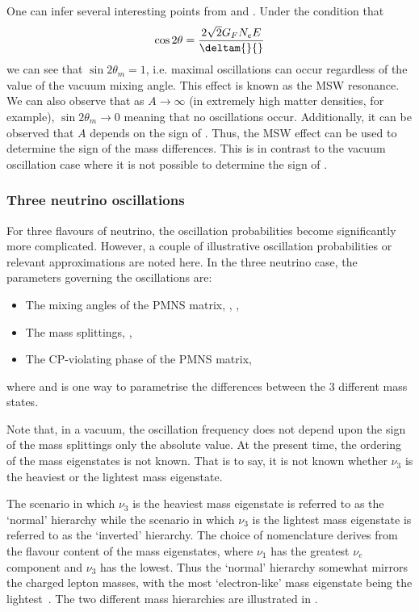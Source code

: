 One can infer several interesting points from  and .
Under the condition that
\begin{equation}
  \cos 2\theta = \frac{2 \sqrt{2} G_{F} N_{e} E}{\deltam{}{}}
\end{equation}
we can see that $\sin 2\theta_{m} = 1$, i.e. maximal oscillations can occur regardless of the value of the vacuum mixing angle.
This effect is known as the MSW resonance.
We can also observe that as $A \rightarrow \infty$ (in extremely high matter densities, for example), $\sin 2\theta_{m} \rightarrow 0$ meaning that no oscillations occur.
Additionally, it can be observed that $A$ depends on the sign of \deltam{}{}.
Thus, the MSW effect can be used to determine the sign of the mass differences.
This is in contrast to the vacuum oscillation case where it is not possible to determine the sign of \deltam{}{}.

\subsubsection{Three neutrino oscillations}
\label{sec:theory:theory:threeNeutrino}

For three flavours of neutrino, the oscillation probabilities become significantly more complicated.
However, a couple of illustrative oscillation probabilities or relevant approximations are noted here.
In the three neutrino case, the parameters governing the oscillations are:
\begin{itemize}
\item The mixing angles of the PMNS matrix, , , 
\item The mass splittings, , 
\item The CP-violating phase of the PMNS matrix, \dcp
\end{itemize}
where  and  is one way to parametrise the differences between the 3 different mass states.

Note that, in a vacuum, the oscillation frequency does not depend upon the sign of the mass splittings only the absolute value.
At the present time, the ordering of the mass eigenstates is not known.
That is to say, it is not known whether $\nu_{3}$ is the heaviest or the lightest mass eigenstate.

The scenario in which $\nu_{3}$ is the heaviest mass eigenstate is referred to as the `normal' hierarchy while the scenario in which $\nu_{3}$ is the lightest mass eigenstate is referred to as the `inverted' hierarchy.
The choice of nomenclature derives from the flavour content of the mass eigenstates, where $\nu_{1}$ has the greatest $\nu_{e}$ component and $\nu_{3}$ has the lowest.
Thus the `normal' hierarchy somewhat mirrors the charged lepton masses, with the most `electron-like' mass eigenstate being the lightest~\cite{massHierarchy}.
The two different mass hierarchies are illustrated in .

